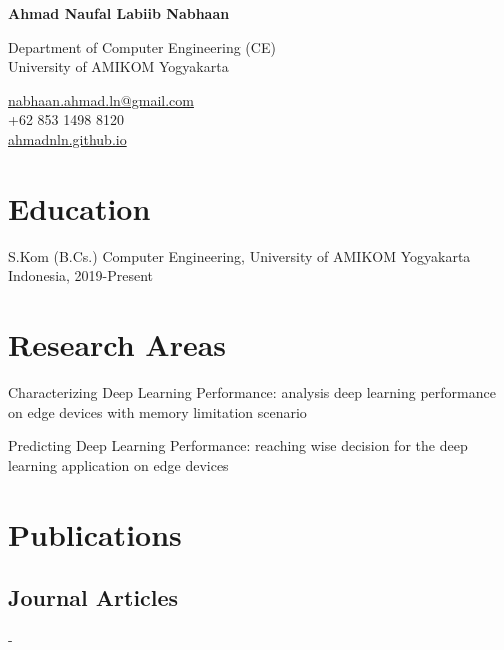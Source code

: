 \documentclass[12pt,letterpaper]{report}
\newcommand{\myname}{Ahmad Naufal Labiib Nabhaan}
\newcommand{\namefont}[1]{{\normalfont\bfseries\Huge{#1}}}
\newcommand{\listitemspace}{0.25em}
\renewenvironment{itemize}
{\begin{list}{}{\setlength{\leftmargin}{0em}
                \setlength{\parskip}{0em}
                \setlength{\itemsep}{\listitemspace}
                \setlength{\parsep}{\listitemspace}}}
{\end{list}}
\begin{document}
    \raggedright{}

    \namefont{\myname}

    \vspace{1em}
    \begin{minipage}[t]{0.700\textwidth}
        Department of Computer Engineering (CE)\\
        University of AMIKOM Yogyakarta
    \end{minipage}
    \begin{minipage}[t]{0.295\textwidth}
        \flushright{}
        \href{mailto:nabhaan.ahmad.ln@gmail.com}{nabhaan.ahmad.ln@gmail.com} \\
        +62 853 1498 8120 \\
        \href{https://administrator2992.github.io}{ahmadnln.github.io}
    \end{minipage}

    \section*{Education}
    
    \begin{tablist}
      \item[S.Kom (B.Cs.)] \tab{}Computer Engineering, University of AMIKOM Yogyakarta \\ Indonesia, 2019-Present
    \end{tablist}
    
    \section*{Research Areas}
    \begin{itemize}
      \item Characterizing Deep Learning Performance: analysis deep learning performance on edge devices with memory limitation scenario
      \item Predicting Deep Learning Performance: reaching wise decision for the deep learning application on edge devices
    \end{itemize}
    
    \section*{Publications}
    \subsection*{Journal Articles}
    \begin{tablist}
        \item[-] \tab{}\fullcite{-}
    \end{tablist}
\end{document}
